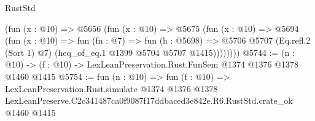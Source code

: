 \begin{lexlean}{RustStd}
\begin{coremodule}
          (fun (x : @10) =>
          @5656
            (fun (x : @10) =>
            @5675
              (fun (x : @10) =>
              @5694
                (fun (x : @10) =>
                fun (fn : @7) =>
                fun (h : @5698) =>
                @5706 @5707 (Eq.refl.{2} (Sort 1) @7) (heq_of_eq.{1} @1399 @5704 @5707 @1415))))))))
@5744 := (n : @10) -> (f : @10) -> LexLeanPreservation.Rust.FunSem @1374 @1376 @1378 @1460 @1415
@5754 := fun (n : @10) =>
  fun (f : @10) =>
  LexLeanPreservation.Rust.simulate
    @1374
    @1376
    @1378
    LexLeanPreserve.C2c341487ca0f9087f17ddbaced3e842e.R6.RustStd.crate_ok
    @1460
    @1415
\end{coremodule}
\end{lexlean}
